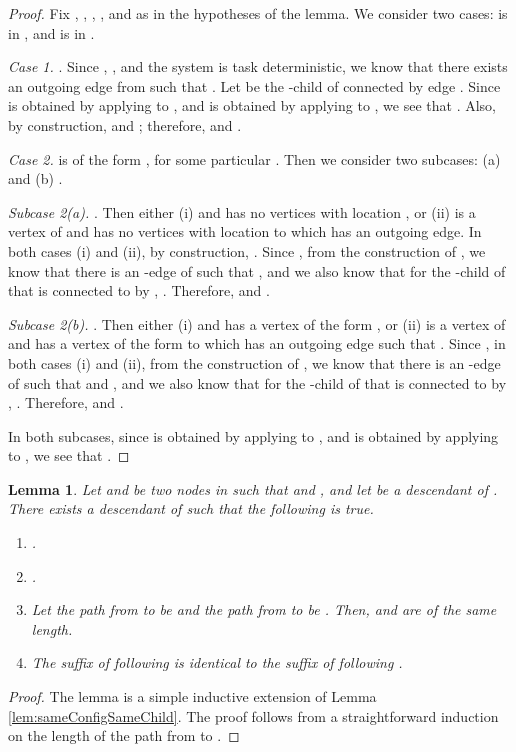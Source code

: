 \documentclass[11pt]{article}
\numberwithin{theorem}{section}
\newtheorem{lemma}[theorem]{Lemma}
\begin{document}
\begin{proof}
 Fix , , , , and  as in the hypotheses of the lemma. We consider two cases:  is in , and  is in . 

 \emph{Case 1.} . Since , , and the system is task deterministic, we know that there exists an outgoing  edge  from  such that . Let  be the -child of  connected by edge . Since  is obtained by applying  to , and  is obtained by applying  to , we see that . Also, by construction,  and ; therefore,  and .

 
 \emph{Case 2.}  is of the form , for some particular . Then we consider two subcases: (a)  and (b) .
 
 \emph{Subcase 2(a).} . Then either (i)  and  has no vertices with location , or (ii)  is a vertex of  and  has no vertices with location  to which  has an outgoing edge. In both cases (i) and (ii), by construction, . Since , from the construction of , we know that there is an -edge  of  such that , and we also know that for the -child  of  that is connected to  by , . Therefore,  and .

\emph{Subcase 2(b).} . Then either (i)  and  has a vertex  of the form , or (ii)  is a vertex of  and  has a vertex  of the form  to which  has an outgoing edge such that . Since , in both cases (i) and (ii), from the construction of , we know that there is an -edge  of  such that  and , and we also know that for the -child  of  that is connected to  by , . Therefore,   and .

In both subcases, since  is obtained by applying  to , and  is obtained by applying  to , we see that .  
 \end{proof}
 
  
 \begin{lemma}\label{lem:sameConfigSameExtensionLength}
 Let  and  be two nodes in  such that  and , and let  be a descendant of . There exists a descendant  of  such that the following is true.
 \begin{enumerate}
 \item .
 \item . 
 \item Let the path from  to  be  and the path from  to  be . Then,  and  are of the same length.
\item The suffix of  following  is identical to the suffix of  following .
  \end{enumerate}
\end{lemma}
\begin{proof}
The lemma is a simple inductive extension of Lemma \ref{lem:sameConfigSameChild}. The proof follows from a straightforward induction on the length of the path from  to .
\end{proof}
\end{document}
